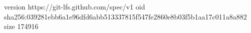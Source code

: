 version https://git-lfs.github.com/spec/v1
oid sha256:039281ebb6a1e96dfd6abb513337815f547fe2860e8b03f5b1aa17c011a8a882
size 174916
